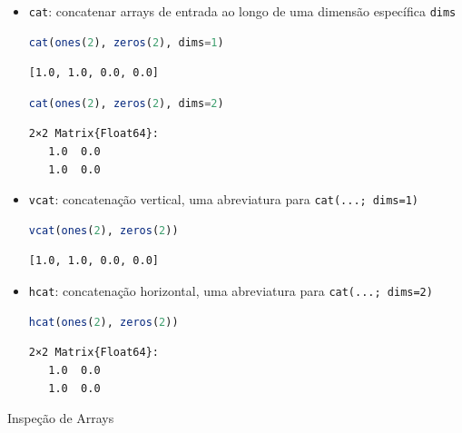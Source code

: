 \documentclass[
  notoc %
]{tufte-book}
\makeatletter
\newcommand{\passthrough}[1]{#1}
\renewcommand\subsubsection{%
\@startsection{subsubsection}{3}{\z@ }{-3.25ex\@plus -1ex \@minus -.2ex}{1.5ex \@plus .2ex}{\normalfont \normalsize \bfseries }
}
\makeatother
\begin{document}
\begin{itemize}
\item
  \passthrough{\lstinline!cat!}: concatenar arrays de entrada ao longo
  de uma dimensão específica \passthrough{\lstinline!dims!}

  \begin{lstlisting}[language=Julia]
  cat(ones(2), zeros(2), dims=1)
  \end{lstlisting}

  \begin{lstlisting}[language=Output]
  [1.0, 1.0, 0.0, 0.0]
  \end{lstlisting}

  \begin{lstlisting}[language=Julia]
  cat(ones(2), zeros(2), dims=2)
  \end{lstlisting}

  \begin{lstlisting}[language=Output]
  2×2 Matrix{Float64}:
   1.0  0.0
   1.0  0.0
  \end{lstlisting}
\item
  \passthrough{\lstinline!vcat!}: concatenação vertical, uma abreviatura
  para \passthrough{\lstinline!cat(...; dims=1)!}

  \begin{lstlisting}[language=Julia]
  vcat(ones(2), zeros(2))
  \end{lstlisting}

  \begin{lstlisting}[language=Output]
  [1.0, 1.0, 0.0, 0.0]
  \end{lstlisting}
\item
  \passthrough{\lstinline!hcat!}: concatenação horizontal, uma
  abreviatura para \passthrough{\lstinline!cat(...; dims=2)!}

  \begin{lstlisting}[language=Julia]
  hcat(ones(2), zeros(2))
  \end{lstlisting}

  \begin{lstlisting}[language=Output]
  2×2 Matrix{Float64}:
   1.0  0.0
   1.0  0.0
  \end{lstlisting}
\end{itemize}

\hypertarget{sec:array_inspection}{%
\subsubsection{Inspeção de Arrays}\label{sec:array_inspection}}
\end{document}
